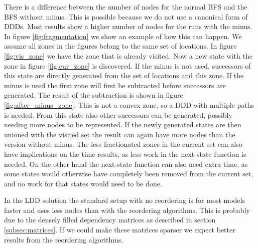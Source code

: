 There is a difference between the number of nodes for the normal BFS and the BFS without minus. This is possible because we do not use a canonical form of DDDs. Most results show a higher number of nodes for the runs with the minus. In figure \ref{fig:fragmentation} we show an example of how this can happen. We assume all zones in the figures belong to the same set of locations. In figure \ref{fig:vis_zone} we have the zone that is already visited. Now a new state with the zone in figure \ref{fig:cur_zone} is discovered. If the minus is not used, successors of this state are directly generated from the set of locations and this zone. If the minus is used the first zone will first be subtracted before successors are generated. The result of the subtraction is shown in figure \ref{fig:after_minus_zone}. This is not a convex zone, so a DDD with multiple paths is needed. From this state also other successors can be generated, possibly needing more nodes to be represented. If the newly generated states are then unioned with the visited set the result can again have more nodes than the version without minus. The less fractionated zones in the current set can also have implications on the time results, as less work in the next-state function is needed. On the other hand the next-state function can also need extra time, as some states would otherwise have completely been removed from the current set, and no work for that states would need to be done. 

In the LDD solution the standard setup with no reordering is for most models faster and uses less nodes than with the reordering algorithms. This is probably due to the densely filled dependency matrices as described in section \ref{subsec:matrices}. If we could make these matrices sparser we expect better results from the reordering algorithms. 

